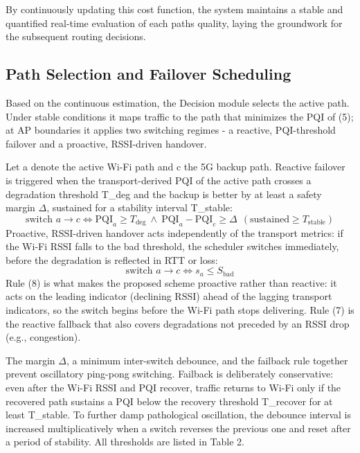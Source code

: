\documentclass[preprint,11pt]{elsarticle}
\begin{document}
By continuously updating this cost function, the system maintains a stable and quantified real-time evaluation of each path\textquotesingle s quality, laying the groundwork for the subsequent routing decisions.
\subsection{Path Selection and Failover Scheduling}
Based on the continuous estimation, the Decision module selects the active path. Under stable conditions it maps traffic to the path that minimizes the PQI of (5); at AP boundaries it applies two switching regimes - a reactive, PQI-threshold failover and a proactive, RSSI-driven handover.

Let a denote the active Wi-Fi path and c the 5G backup path. Reactive failover is triggered when the transport-derived PQI of the active path crosses a degradation threshold T\_deg and the backup is better by at least a safety margin $\Delta$, sustained for a stability interval T\_stable:
\begin{equation}\label{eq:7}
\text{switch } a\!\to\!c \iff \mathrm{PQI}_a \ge T_{\deg}\ \wedge\ \mathrm{PQI}_a-\mathrm{PQI}_c \ge \Delta\ \ (\text{sustained} \ge T_{\mathrm{stable}})
\end{equation}
Proactive, RSSI-driven handover acts independently of the transport metrics: if the Wi-Fi RSSI falls to the \textquotesingle bad\textquotesingle{} threshold, the scheduler switches immediately, before the degradation is reflected in RTT or loss:
\begin{equation}\label{eq:8}
\text{switch } a\!\to\!c \iff s_a \le S_{\mathrm{bad}}
\end{equation}
Rule (8) is what makes the proposed scheme proactive rather than reactive: it acts on the leading indicator (declining RSSI) ahead of the lagging transport indicators, so the switch begins before the Wi-Fi path stops delivering. Rule (7) is the reactive fallback that also covers degradations not preceded by an RSSI drop (e.g., congestion).

The margin $\Delta$, a minimum inter-switch debounce, and the failback rule together prevent oscillatory \textquotesingle ping-pong\textquotesingle{} switching. Failback is deliberately conservative: even after the Wi-Fi RSSI and PQI recover, traffic returns to Wi-Fi only if the recovered path sustains a PQI below the recovery threshold T\_recover for at least T\_stable. To further damp pathological oscillation, the debounce interval is increased multiplicatively when a switch reverses the previous one and reset after a period of stability. All thresholds are listed in Table 2.
\end{document}
